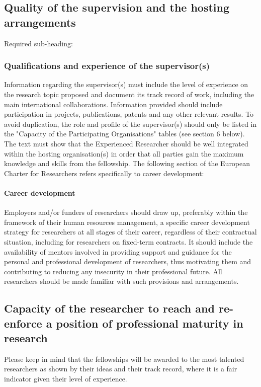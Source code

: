 \subsection{Quality of the supervision and the hosting arrangements}
\label{sec:supervision}

Required sub-heading:
\subsubsection*{Qualifications and experience of the supervisor(s)}

Information regarding the supervisor(s) must include the level of experience on the research topic proposed and document its track record of work, including the main international collaborations. Information provided should include participation in projects, publications, patents and any other relevant results.
To avoid duplication, the role and profile of the supervisor(s) should only be listed in the "Capacity of the Participating Organisations" tables (see section 6 below).
The text must show that the Experienced Researcher should be well integrated within the hosting organisation(s) in order that all parties gain the maximum knowledge and skills from the fellowship.
The following section of the European Charter for Researchers refers specifically to career development:

\paragraph{Career development}
Employers and/or funders of researchers should draw up, preferably within the framework of their human resources management, a specific career development strategy for researchers at all stages of their career, regardless of their contractual situation, including for researchers on fixed-term contracts. It should include the availability of mentors involved in providing support and guidance for the personal and professional development of researchers, thus motivating them and contributing to reducing any insecurity in their professional future. All researchers should be made familiar with such provisions and arrangements.

\subsection{Capacity of the researcher to reach and re-enforce a position of professional maturity in research}
\label{sec:maturity}

Please keep in mind that the fellowships will be awarded to the most talented researchers as shown by their ideas and their track record, where it is a fair indicator given their level of experience.
